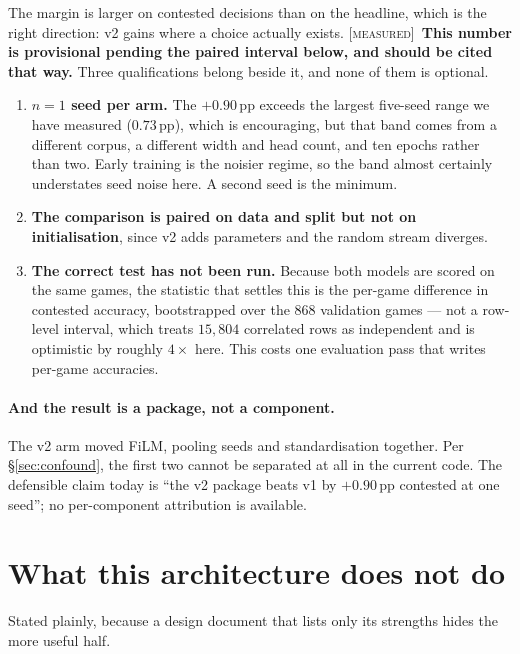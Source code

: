 \documentclass[11pt,a4paper]{article}
\newcommand{\tagM}{\textcolor{cV2}{\textsc{[measured]}}}
\begin{document}
\noindent
The margin is larger on contested decisions than on the headline, which is the
right direction: v2 gains where a choice actually exists. \tagM\ \textbf{This
number is provisional pending the paired interval below, and should be cited
that way.} Three qualifications belong beside it, and none of them is optional.

\begin{enumerate}\itemsep2pt
\item \textbf{$n=1$ seed per arm.} The $+0.90$\,pp exceeds the largest five-seed
range we have measured ($0.73$\,pp), which is encouraging, but that band comes
from a different corpus, a different width and head count, and ten epochs rather
than two. Early training is the noisier regime, so the band almost certainly
understates seed noise here. A second seed is the minimum.
\item \textbf{The comparison is paired on data and split but not on
initialisation}, since v2 adds parameters and the random stream diverges.
\item \textbf{The correct test has not been run.} Because both models are scored
on the same games, the statistic that settles this is the per-game difference in
contested accuracy, bootstrapped over the $868$ validation games --- not a
row-level interval, which treats $15{,}804$ correlated rows as independent and is
optimistic by roughly $4\times$ here. This costs one evaluation pass that writes
per-game accuracies.
\end{enumerate}

\paragraph{And the result is a package, not a component.} The v2 arm moved FiLM,
pooling seeds and standardisation together. Per \S\ref{sec:confound}, the first
two cannot be separated at all in the current code. The defensible claim today is
``the v2 package beats v1 by $+0.90$\,pp contested at one seed''; no
per-component attribution is available.

\section{What this architecture does not do}

Stated plainly, because a design document that lists only its strengths hides the
more useful half.
\end{document}
